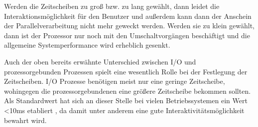 Werden die Zeitscheiben zu groß bzw. zu lang gewählt, dann leidet die Interaktionsmöglichkeit für den Benutzer und außerdem kann dann der Anschein der Parallel\-ver\-arbeitung nicht mehr geweckt werden.
Werden sie zu klein gewählt, dann ist der Prozessor nur noch mit den Umschaltvorgängen beschäftigt und die allgemeine Systemperformance wird erheblich gesenkt.

Auch der oben bereits erwähnte Unterschied zwischen I/O und prozessorgebunden Prozessen spielt eine wesentlich Rolle bei der Festlegung der Zeitscheiben. I/O Prozesse benötigen meist nur eine geringe Zeitscheibe, wohingegen die prozessorgebundenen eine größere Zeitscheibe bekommen sollten. 
Als Standardwert hat sich an dieser Stelle bei vielen Betriebssystemen ein Wert \textless10ms etabliert \cite{rlove}, da damit unter anderem eine gute Inter\-ak\-ti\-vitäts\-mög\-lich\-keit bewahrt wird.
%

